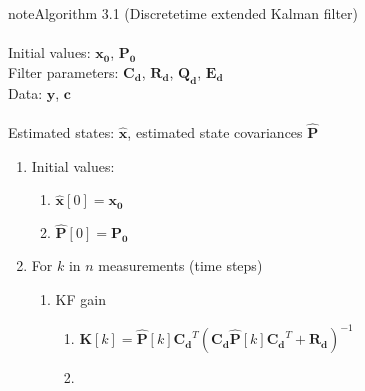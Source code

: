 \begin{figure}[h]
\noindent\begin{sphinxadmonition}{note}{Algorithm 3.1 (Discrete\sphinxhyphen{}time extended Kalman filter)} \\
 \\
\hspace*{0.5cm} Initial values: \(\mathbf{x_0}\), \(\mathbf{P_0}\) \\
\hspace*{0.5cm} Filter parameters: \(\mathbf{C_d}\), \(\mathbf{R_d}\), \(\mathbf{Q_d}\), \(\mathbf{E_d}\) \\
\hspace*{0.5cm} Data: \(\mathbf{y}\), \(\mathbf{c}\) \\
 \\
\hspace*{0.5cm} Estimated states: \(\mathbf{\hat{x}}\), estimated state covariances \(\mathbf{\hat{P}}\)
\vspace{0.2cm}
\begin{enumerate}
%
\item {} 
Initial values:
\begin{enumerate}
%
\item {} 

\(\mathbf{\hat{x}}[0] = \mathbf{x_0}\)

\item {} 

\(\mathbf{\hat{P}}[0] = \mathbf{P_0}\)

\end{enumerate}

\item {} 

For \(k\) in \(n\) measurements (time steps)
\begin{enumerate}
%
\item {} 

KF gain
\begin{enumerate}
%
\item {} 

\(\mathbf{K}[k]=\mathbf{\hat{P}}[k] \mathbf{C_d}^T \left(\mathbf{C_d} \mathbf{\hat{P}}[k] \mathbf{C_d}^T + \mathbf{R_d}\right)^{-1}\)

\item {} 


\end{enumerate}
\end{enumerate}
\end{enumerate}
\end{sphinxadmonition}
\end{figure}

